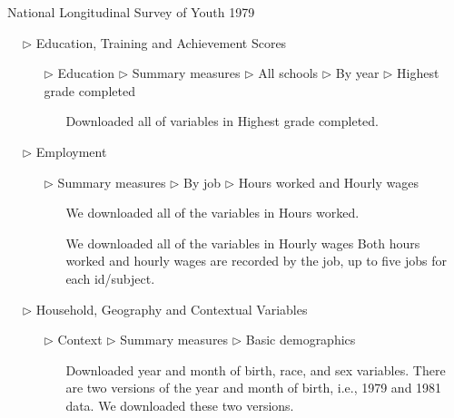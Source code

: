 \documentclass{article}
\begin{document}
\begin{tcolorbox}[label="box:data", title=Getting the data]

\faDatabase~National Longitudinal Survey of Youth 1979

\begin{itemize}
\item[$\triangleright$] Education, Training and Achievement Scores
\begin{itemize}
\item[$\triangleright$] Education $\triangleright$ Summary measures $\triangleright$ All schools $\triangleright$ By year $\triangleright$ Highest grade completed
\begin{itemize}
\item[\faCloudDownload] Downloaded all of variables in Highest grade completed.
\end{itemize}
\end{itemize}
\item[$\triangleright$] Employment
\begin{itemize}
\item[$\triangleright$] Summary measures $\triangleright$ By job $\triangleright$ Hours worked and Hourly wages
\begin{itemize}
\item[\faCloudDownload] We downloaded all of the variables in Hours worked.
\item[\faCloudDownload] We downloaded all of the variables in Hourly wages
  Both hours worked and hourly wages are recorded by the job, up to five jobs for each id/subject. 
\end{itemize}
\end{itemize}
\item[$\triangleright$] Household, Geography and Contextual Variables
\begin{itemize}
\item[$\triangleright$] Context $\triangleright$ Summary measures $\triangleright$ Basic demographics 
\begin{itemize}
\item[\faCloudDownload] Downloaded year and month of birth, race, and sex variables. There are two versions of the year and month of birth, i.e., 1979 and 1981 data. We downloaded these two versions.
\end{itemize}
\end{itemize}
\end{itemize}

\end{tcolorbox}
\end{document}
